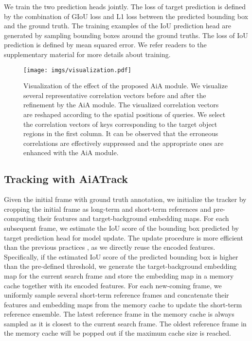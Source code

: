 We train the two prediction heads jointly. The loss of target prediction is defined by the combination of GIoU loss \cite{rezatofighi2019generalized} and L1 loss between the predicted bounding box and the ground truth. The training examples of the IoU prediction head are generated by sampling bounding boxes around the ground truths. The loss of IoU prediction is defined by mean squared error. We refer readers to the supplementary material for more details about training.

\begin{figure}[t]
\centering
\texttt{[image: imgs/visualization.pdf]}
\caption{Visualization of the effect of the proposed AiA module. We visualize several representative correlation vectors before and after the refinement by the AiA module. The visualized correlation vectors are reshaped according to the spatial positions of queries. We select the correlation vectors of keys corresponding to the target object regions in the first column. It can be observed that the erroneous correlations are effectively suppressed and the appropriate ones are enhanced with the AiA module.}
\label{figure-visualization}
\end{figure}

\subsection{Tracking with AiATrack}\label{section-tracking}
Given the initial frame with ground truth annotation, we initialize the tracker by cropping the initial frame as long-term and short-term references and pre-computing their features and target-background embedding maps. For each subsequent frame, we estimate the IoU score of the bounding box predicted by target prediction head for model update. The update procedure is more efficient than the previous practices \cite{fu2021stmtrack,wang2021transformer,yan2021learning}, as we directly reuse the encoded features. Specifically, if the estimated IoU score of the predicted bounding box is higher than the pre-defined threshold, we generate the target-background embedding map for the current search frame and store the embedding map in a memory cache together with its encoded features. For each new-coming frame, we uniformly sample several short-term reference frames and concatenate their features and embedding maps from the memory cache to update the short-term reference ensemble. The latest reference frame in the memory cache is always sampled as it is closest to the current search frame. The oldest reference frame in the memory cache will be popped out if the maximum cache size is reached.

